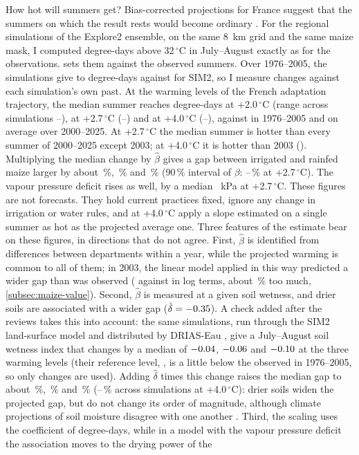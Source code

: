 How hot will summers get? Bias-corrected projections for France suggest that the summers on which the result rests would become ordinary \parencite{drias2022}. For the \DriasModels{} regional simulations of the Explore2 ensemble, on the same 8~km grid and the same maize mask, I computed degree-days above 32\,$^{\circ}$C in July--August exactly as for the observations.  sets them against the observed summers. Over 1976--2005, the simulations give \DriasCtlMin{} to \DriasCtlMax{} degree-days against \DriasCtlSim{} for SIM2, so I measure changes against each simulation's own past. At the warming levels of the French adaptation trajectory, the median summer reaches \DriasDdTwo{} degree-days at +2.0\,$^{\circ}$C (range across simulations \DriasDdTwoMin--\DriasDdTwoMax), \DriasDdTwoSeven{} at +2.7\,$^{\circ}$C (\DriasDdTwoSevenMin--\DriasDdTwoSevenMax) and \DriasDdFour{} at +4.0\,$^{\circ}$C (\DriasDdFourMin--\DriasDdFourMax), against \DriasDdRef{} in 1976--2005 and \DriasObsMean{} on average over 2000--2025. At +2.7\,$^{\circ}$C the median summer is hotter than every summer of 2000--2025 except 2003; at +4.0\,$^{\circ}$C it is hotter than 2003 (\DriasObsThree). Multiplying the median change by $\hat\beta$ gives a gap between irrigated and rainfed maize larger by about \DriasGapTwo\,\%, \DriasGapTwoSeven\,\% and \DriasGapFour\,\% (90\,\% interval of $\beta$: \DriasGapTwoSevenLow--\DriasGapTwoSevenHigh\,\% at +2.7\,$^{\circ}$C). The vapour pressure deficit rises as well, by a median \DriasVpdTwoSeven~kPa at +2.7\,$^{\circ}$C. These figures are not forecasts. They hold current practices fixed, ignore any change in irrigation or water rules, and at +4.0\,$^{\circ}$C apply a slope estimated on a single summer as hot as the projected average one. Three features of the estimate bear on these figures, in directions that do not agree. First, $\hat\beta$ is identified from differences between departments within a year, while the projected warming is common to all of them; in 2003, the linear model applied in this way predicted a wider gap than was observed (\LinPredThree{} against \ObsThree{} in log terms, about \ValOverPct\,\% too much, \cref{subsec:maize-value}). Second, $\hat\beta$ is measured at a given soil wetness, and drier soils are associated with a wider gap ($\hat\delta = -0.35$). A check added after the reviews takes this into account: the same simulations, run through the SIM2 land-surface model and distributed by DRIAS-Eau \parencite{driaseau2024}, give a July--August soil wetness index that changes by a median of $-0.04$, $-0.06$ and $-0.10$ at the three warming levels (their reference level, \SoilRefSwi, is a little below the \SoilObsSwi{} observed in 1976--2005, so only changes are used). Adding $\hat\delta$ times this change raises the median gap to about \SoilGapTwo\,\%, \SoilGapTwoSeven\,\% and \SoilGapFour\,\% (\SoilGapFourMin--\SoilGapFourMax\,\% across simulations at +4.0\,$^{\circ}$C): drier soils widen the projected gap, but do not change its order of magnitude, although climate projections of soil moisture disagree with one another \parencite{rigden2020}. Third, the scaling uses the coefficient of degree-days, while in a model with the vapour pressure deficit the association moves to the drying power of the 